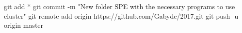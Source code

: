 git add *
git commit -m "New folder SPE with the necessary programs to use cluster"
git remote add origin https://github.com/Gabydc/2017.git
git push -u origin master
